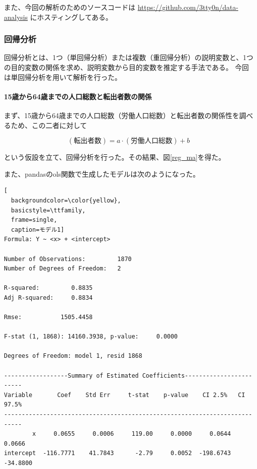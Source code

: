\documentclass[a4paper,xelatex,ja=standard,jafont=hiragino-pron, 10pt]{bxjsarticle}
\begin{document}
また、今回の解析のためのソースコードは \url{https://github.com/3tty0n/data-analysis} にホスティングしてある。
\subsubsection{回帰分析}

回帰分析とは、1つ（単回帰分析）または複数（重回帰分析）の説明変数と、1つの目的変数の関係を求め、説明変数から目的変数を推定する手法である。
今回は単回帰分析を用いて解析を行った。

\paragraph{15歳から64歳までの人口総数と転出者数の関係}

まず、15歳から64歳までの人口総数（労働人口総数）と転出者数の関係性を調べるため、この二者に対して

\begin{equation}
  (\mbox{転出者数}) = a \cdot (\mbox{労働人口総数}) + b
\end{equation}

という仮設を立て、回帰分析を行った。その結果、図\ref{reg_ma}を得た。

また、pandasのols関数で生成したモデルは次のようになった。

\begin{lstlisting}[
  backgroundcolor=\color{yellow},
  basicstyle=\ttfamily,
  frame=single,
  caption=モデル1]
Formula: Y ~ <x> + <intercept>

Number of Observations:         1870
Number of Degrees of Freedom:   2

R-squared:         0.8835
Adj R-squared:     0.8834

Rmse:           1505.4458

F-stat (1, 1868): 14160.3938, p-value:     0.0000

Degrees of Freedom: model 1, resid 1868

------------------Summary of Estimated Coefficients------------------------
Variable       Coef    Std Err     t-stat    p-value    CI 2.5%   CI 97.5%
---------------------------------------------------------------------------
        x     0.0655     0.0006     119.00     0.0000     0.0644     0.0666
intercept  -116.7771    41.7843      -2.79     0.0052  -198.6743   -34.8800
\end{lstlisting}
\end{document}
